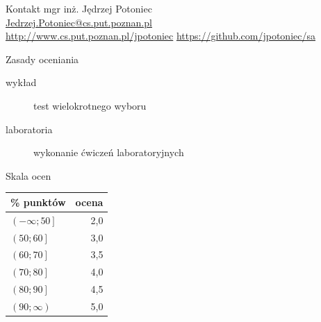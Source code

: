 \documentclass{sa}
\subtitle{Uwagi organizacyjne}
\begin{document}
\begin{frame}
\titlepage
\end{frame}
\begin{frame}{Kontakt}
mgr inż. Jędrzej Potoniec \\
\url{Jedrzej.Potoniec@cs.put.poznan.pl}\\
\url{http://www.cs.put.poznan.pl/jpotoniec}
\url{https://github.com/jpotoniec/sa}
\end{frame}
\begin{frame}{Zasady oceniania}
\begin{description}
\item[wykład] test wielokrotnego wyboru
\item[laboratoria] wykonanie ćwiczeń laboratoryjnych
\end{description}
\end{frame}
\begin{frame}{Skala ocen}
\begin{center}
\begin{tabular}{l|r}
\% punktów & ocena \\
\hline
$\left(-\infty; 50\right]$ & 2,0 \\
$\left(50; 60\right]$ & 3,0 \\
$\left(60; 70\right]$ & 3,5 \\
$\left(70; 80\right]$ & 4,0 \\
$\left(80; 90\right]$ & 4,5 \\
$\left(90; \infty\right)$ & 5,0 \\
\end{tabular}
\end{center}
\end{frame}
\end{document}
